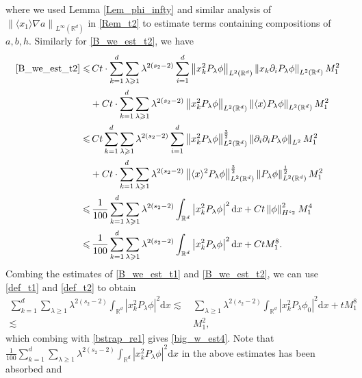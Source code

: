\documentclass[10pt,twoside,a4paper]{article}
\numberwithin{equation}{section}\allowdisplaybreaks
\def\leq{\leqslant}
\def\geq{\geqslant}
\begin{document}
	where we used Lemma \ref{Lem_phi_infty}  and similar analysis of $\left\|\langle x_1\rangle \nabla a  \right\|_{L^{\infty}(\mathbb{R}^d)} $ in  \eqref{Rem_t2} to estimate terms containing compositions of $a,b, h$.
	Similarly for \eqref{B_we_est_t2}, we have
	\begin{align*}
		\eqref{B_we_est_t2} \leq& \, C t \cdot \sum_{k=1}^d\sum_{\lambda\geq 1} \lambda^{2(s_2-2)}  \sum_{i=1}^d \left\| x^2_k P_{\lambda}\phi  \right\|_{L^{2}(\mathbb{R}^d)} \left\|x_k \partial_i P_{\lambda}\phi \right\|_{L^{2}(\mathbb{R}^d)} M_1^2\\
		&+Ct \cdot \sum_{k=1}^d\sum_{\lambda\geq 1} \lambda^{2(s_2-2)}   \left\| x^2_k P_{\lambda}\phi  \right\|_{L^{2}(\mathbb{R}^d)} \left\| \langle x \rangle  P_{\lambda}\phi \right\|_{L^{2}(\mathbb{R}^d)} M_1^2\\
		\leq&\, Ct  \sum_{k=1}^d\sum_{\lambda\geq 1} \lambda^{2(s_2-2)}   \sum_{i=1}^d \left\| x^2_k P_{\lambda}\phi  \right\|_{L^{2}(\mathbb{R}^d)}^{\frac 32} \left\|\partial_{i} \partial_i P_{\lambda}\phi \right\|_{L^2 } M_1^2\\
		&+Ct \cdot  \sum_{k=1}^d\sum_{\lambda\geq 1} \lambda^{2(s_2-2)}    \left\| \langle x \rangle^2  P_{\lambda}\phi \right\|_{L^{2}(\mathbb{R}^d)}^{\frac 32}   \left\|   P_{\lambda}\phi \right\|_{L^{2}(\mathbb{R}^d)}^{\frac 12} M_1^2\\
		\leq & \,	\frac{1}{100}   \sum_{k=1}^d\sum_{\lambda\geq 1} \lambda^{2(s_2-2)} \int_{\mathbb{R}^{d}} \left| x_k^2P_{\lambda}\phi\right|^2 \mathrm{d} x+ Ct     \left\|\phi\right\|_{H^{s_2}}^2 M_1^4\\
		\leq &\, \frac{1}{100}   \sum_{k=1}^d\sum_{\lambda\geq 1} \lambda^{2(s_2-2)} \int_{\mathbb{R}^{d}} \left| x_k^2P_{\lambda}\phi\right|^2 \mathrm{d} x+Ct M_1^8.
	\end{align*}
	Combing the estimates of 	\eqref{B_we_est_t1} and 	\eqref{B_we_est_t2}, we can use \eqref{def_t1} and \eqref{def_t2} to obtain
	\begin{align}  \label{Big_wt_est}
		\sum_{k=1}^d	\sum_{\lambda\geq 1} \lambda^{2(s_2-2)} \int_{\mathbb{R}^{d}} \left| x_k^2P_{\lambda}\phi\right|^2 \mathrm{d} x  \lesssim &\, \sum_{\lambda\geq 1} \lambda^{2(s_2-2)} \int_{\mathbb{R}^{d}} \left| x_k^2P_{\lambda}\phi_0\right|^2 \mathrm{d} x  +t M_1^8 \\
		\lesssim& \,M_1^2, \nonumber
	\end{align} 
	which combing with \eqref{bstrap_re1} gives \eqref{big_w_est4}. Note that $\frac{1}{100}   \sum_{k=1}^d\sum_{\lambda\geq 1} \lambda^{2(s_2-2)} \int_{\mathbb{R}^{d}} \left| x_k^2P_{\lambda}\phi\right|^2 \mathrm{d} x$ in the above estimates has been absorbed  and
\end{document}
